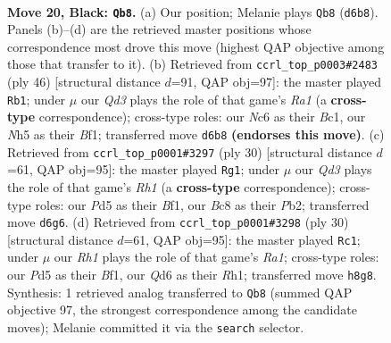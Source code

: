 \documentclass[11pt]{article}
\begin{document}
\clearpage

\begin{figure}[p]\centering
\begin{subfigure}{0.46\textwidth}\centering
\resizebox{\linewidth}{!}{%
\newchessgame
\chessboard[
  setfen={r1b1k2r/p3b1pp/1pnq4/3p1p1n/Pp1P3P/4PNPB/RB2QP2/1N2R1K1 b - - 4 20},
  showmover=false,
  pgfstyle=straightmove, color=movearrow, markmove={d6-b8}
]}
\caption{}
\end{subfigure}\hfill
\begin{subfigure}{0.46\textwidth}\centering
\resizebox{\linewidth}{!}{%
\newchessgame
\chessboard[
  setfen={2r2r1k/2nq1nbp/p1p5/2Pp1pp1/P2Pp3/1QN4P/5PP1/R1BRNBK1 w - - 0 24},
  showmover=false,
  pgfstyle=straightmove, color=movearrow, markmove={a1-b1}
]}
\caption{}
\end{subfigure}
\\[4pt]
\begin{subfigure}{0.46\textwidth}\centering
\resizebox{\linewidth}{!}{%
\newchessgame
\chessboard[
  setfen={r1br2k1/p3qpb1/1pn2np1/2p4p/2P1PN1P/2N1BP2/PP3Q2/R3KB1R w KQ - 0 16},
  showmover=false,
  pgfstyle=straightmove, color=movearrow, markmove={h1-g1}
]}
\caption{}
\end{subfigure}\hfill
\begin{subfigure}{0.46\textwidth}\centering
\resizebox{\linewidth}{!}{%
\newchessgame
\chessboard[
  setfen={r1br2k1/p3qpb1/1pn2np1/2p4p/2P1PN1P/2N1BP2/PP3Q2/R3KB1R w KQ - 0 16},
  showmover=false,
  pgfstyle=straightmove, color=movearrow, markmove={a1-c1}
]}
\caption{}
\end{subfigure}
\caption{\textbf{Move 20, Black: \texttt{Qb8}.} (a) Our position; Melanie plays \texttt{Qb8} (\texttt{d6b8}). Panels (b)--(d) are the retrieved master positions whose correspondence most drove this move (highest QAP objective among those that transfer to it). (b) Retrieved from \texttt{ccrl\_top\_p0003\#2483} (ply 46) [structural distance $d$=91, QAP obj=97]: the master played \texttt{Rb1}; under $\mu$ our \emph{Qd3} plays the role of that game's \emph{Ra1} (a \textbf{cross-type} correspondence); cross-type roles: our \emph{N}c6 as their \emph{B}c1, our \emph{N}h5 as their \emph{B}f1; transferred move \texttt{d6b8} \textbf{(endorses this move)}. (c) Retrieved from \texttt{ccrl\_top\_p0001\#3297} (ply 30) [structural distance $d$=61, QAP obj=95]: the master played \texttt{Rg1}; under $\mu$ our \emph{Qd3} plays the role of that game's \emph{Rh1} (a \textbf{cross-type} correspondence); cross-type roles: our \emph{P}d5 as their \emph{B}f1, our \emph{B}c8 as their \emph{P}b2; transferred move \texttt{d6g6}. (d) Retrieved from \texttt{ccrl\_top\_p0001\#3298} (ply 30) [structural distance $d$=61, QAP obj=95]: the master played \texttt{Rc1}; under $\mu$ our \emph{Rh1} plays the role of that game's \emph{Ra1}; cross-type roles: our \emph{P}d5 as their \emph{B}f1, our \emph{Q}d6 as their \emph{R}h1; transferred move \texttt{h8g8}. Synthesis: 1 retrieved analog transferred to \texttt{Qb8} (summed QAP objective 97, the strongest correspondence among the candidate moves); Melanie committed it via the \texttt{search} selector.}
\label{fig:thought-m39}
\end{figure}
\end{document}
